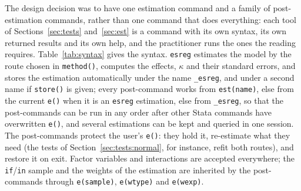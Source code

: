 \documentclass[11pt,a4paper]{article}
\theoremstyle{plain}
\theoremstyle{definition}
\theoremstyle{remark}
\newcommand{\1}{\mathbf{1}}
\newcommand{\cmd}[1]{\texttt{#1}}
\begin{document}
The design decision was to have one estimation command and a family
of post-estimation commands, rather than one command that does
everything: each tool of Sections~\ref{sec:tests} and~\ref{sec:est}
is a command with its own syntax, its own returned results and its
own help, and the practitioner runs the ones the reading requires.
Table~\ref{tab:syntax} gives the syntax. \cmd{esreg} estimates the
model by the route chosen in \cmd{method()}, computes the effects,
$\kappa$ and their standard errors, and stores the estimation
automatically under the name \cmd{\_esreg}, and under a second name if
\cmd{store()} is given; every post-command works from \cmd{est(name)},
else from the current \cmd{e()} when it is an \cmd{esreg} estimation,
else from \cmd{\_esreg}, so that the post-commands can be run in any
order after other Stata commands have overwritten \cmd{e()}, and
several estimations can be kept and queried in one session. The
post-commands protect the user's \cmd{e()}: they hold it, re-estimate
what they need (the tests of Section~\ref{sec:tests:normal}, for
instance, refit both routes), and restore it on exit. Factor variables
and interactions are accepted everywhere; the \cmd{if}/\cmd{in}
sample and the weights of the estimation are inherited by the
post-commands through \cmd{e(sample)}, \cmd{e(wtype)} and
\cmd{e(wexp)}.
\end{document}
